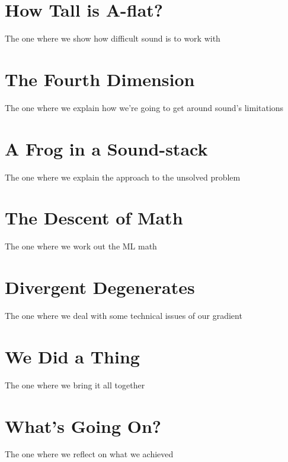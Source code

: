\documentclass[10pt,a4paper]{article}
\begin{document}
\section{How Tall is A-flat?}
The one where we show how difficult sound is to work with
\section{The Fourth Dimension}
The one where we explain how we're going to get around sound's limitations
\section{A Frog in a Sound-stack}
The one where we explain the approach to the unsolved problem
\section{The Descent of Math}
The one where we work out the ML math
\section{Divergent Degenerates}
The one where we deal with some technical issues of our gradient
\section{We Did a Thing}
The one where we bring it all together
\section{What's Going On?}
The one where we reflect on what we achieved



\end{document}
